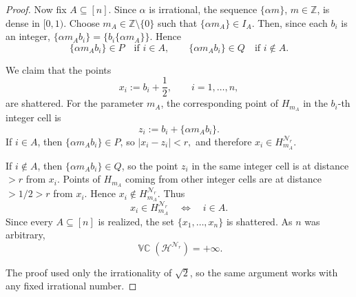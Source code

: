 \documentclass[10pt,a4paper]{amsart}
\DeclareMathOperator{\VCdim}{\mathbb{VC}}
\newcommand{\Z}{\mathbb{Z}}
\begin{document}
\begin{proof}
Now fix \(A\subseteq[n]\). Since \(\alpha\) is irrational, the sequence
\(\{\alpha m\}\), \(m\in\Z\), is dense in \([0,1)\). Choose
\(m_A\in\Z\setminus\{0\}\) such that $\{\alpha m_A\}\in I_A$. Then, since each \(b_i\) is an integer,
\(
\{\alpha m_A b_i\}
=
\{b_i\{\alpha m_A\}\}.
\)
Hence
\[
\{\alpha m_A b_i\}\in P \quad\text{if } i\in A,
\qquad
\{\alpha m_A b_i\}\in Q \quad\text{if } i\notin A.
\]

We claim that the points
\[
x_i:=b_i+\frac12,
\qquad i=1,\ldots,n,
\]
are shattered. For the parameter \(m_A\), the corresponding point of
\(H_{m_A}\) in the \(b_i\)-th integer cell is
\[
z_i:=b_i+\{\alpha m_A b_i\}.
\]
If \(i\in A\), then \(\{\alpha m_A b_i\}\in P\), so
\(
|x_i-z_i|<r,
\)
and therefore \(x_i\in H_{m_A}^{\mathcal N_r}\).

If \(i\notin A\), then \(\{\alpha m_A b_i\}\in Q\), so the point \(z_i\) in the
same integer cell is at distance \(>r\) from \(x_i\). Points of \(H_{m_A}\)
coming from other integer cells are at distance \(>1/2>r\) from \(x_i\). Hence
\(
x_i\notin H_{m_A}^{\mathcal N_r}.
\)
Thus
\[
x_i\in H_{m_A}^{\mathcal N_r}
\quad\Longleftrightarrow\quad
i\in A.
\]
Since every \(A\subseteq[n]\) is realized, the set
\(\{x_1,\ldots,x_n\}\) is shattered. As \(n\) was arbitrary,
\[
\VCdim(\mathcal H^{\mathcal N_r})=+\infty.
\]

The proof used only the irrationality of \(\sqrt2\), so the same argument works
with any fixed irrational number.
\end{proof}
\end{document}

